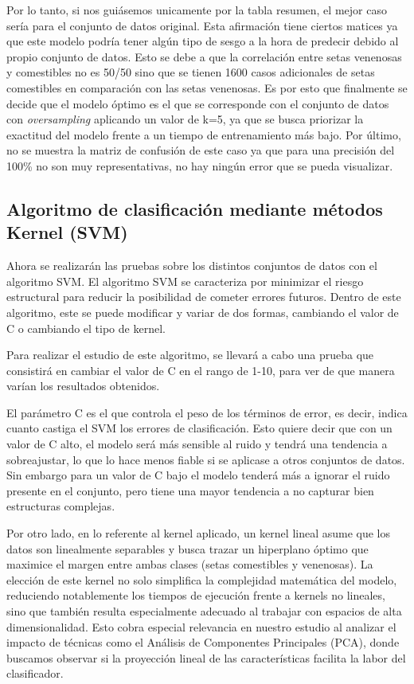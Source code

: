 \documentclass{Plantilla/Formato_EPEF}
\begin{document}
Por lo tanto, si nos guiásemos unicamente por la tabla resumen, el mejor caso sería para el conjunto de datos original. Esta afirmación tiene ciertos matices ya que este modelo podría tener algún tipo de sesgo a la hora de predecir debido al propio conjunto de datos. Esto se debe a que la correlación entre setas venenosas y comestibles no es 50/50 sino que se tienen 1600 casos adicionales de setas comestibles en comparación con las setas venenosas. Es por esto que finalmente se decide que el modelo óptimo es el que se corresponde con el conjunto de datos con \textit{oversampling} aplicando un valor de k=5, ya que se busca priorizar la exactitud del modelo frente a un tiempo de entrenamiento más bajo. Por último, no se muestra la matriz de confusión de este caso ya que para una precisión del 100\% no son muy representativas, no hay ningún error que se pueda visualizar.

\subsection{Algoritmo de clasificación mediante métodos Kernel (SVM)}

	Ahora se realizarán las pruebas sobre los distintos conjuntos de datos con el algoritmo SVM. El algoritmo SVM se caracteriza por minimizar el riesgo estructural para reducir la posibilidad de cometer errores futuros. Dentro de este algoritmo, este se puede modificar y variar de dos formas, cambiando el valor de C o cambiando el tipo de kernel. 
	
	Para realizar el estudio de este algoritmo, se llevará a cabo una prueba que consistirá en cambiar el valor de C en el rango de 1-10, para ver de que manera varían los resultados obtenidos.
	
	El parámetro C es el que controla el peso de los términos de error, es decir, indica cuanto castiga el SVM los errores de clasificación. Esto quiere decir que con un valor de C alto, el modelo será más sensible al ruido y tendrá una tendencia a sobreajustar, lo que lo hace menos fiable si se aplicase a otros conjuntos de datos. Sin embargo para un valor de C bajo el modelo tenderá más a ignorar el ruido presente en el conjunto, pero tiene una mayor tendencia a no capturar bien estructuras complejas.
	
	Por otro lado, en lo referente al kernel aplicado, un kernel lineal asume que los datos son linealmente separables y busca trazar un hiperplano óptimo que maximice el margen entre ambas clases (setas comestibles y venenosas). La elección de este kernel no solo simplifica la complejidad matemática del modelo, reduciendo notablemente los tiempos de ejecución frente a kernels no lineales, sino que también resulta especialmente adecuado al trabajar con espacios de alta dimensionalidad. Esto cobra especial relevancia en nuestro estudio al analizar el impacto de técnicas como el Análisis de Componentes Principales (PCA), donde buscamos observar si la proyección lineal de las características facilita la labor del clasificador.
	
\end{document}
